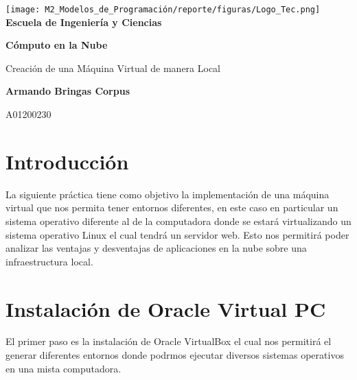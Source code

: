 \documentclass[12pt,a4paper]{article}
\begin{document}
\begin{titlepage}
    \centering
    \texttt{[image: M2\_Modelos\_de\_Programación/reporte/figuras/Logo\_Tec.png]}\\
    \vspace{.5cm}
    \bfseries\large Escuela de Ingeniería y Ciencias
        
    \vspace{5cm}
    \centering
    \textbf{\Huge Cómputo en la Nube}
    \vspace{0.5cm}
        
    {\Large Creación de una Máquina Virtual de manera Local}

    \vspace{5cm}
        
    \textbf{\LARGE Armando Bringas Corpus}
        
    \vspace{0.5cm}
        
    {\large A01200230}
        
    \vfill
        
\end{titlepage}

\section{Introducción}

La siguiente práctica tiene como objetivo la implementación de una máquina virtual que nos permita tener entornos diferentes, en este caso en particular un sistema operativo diferente al de la computadora donde se estará virtualizando un sistema operativo Linux el cual tendrá un servidor web. Esto nos permitirá poder analizar las ventajas y desventajas de aplicaciones en la nube sobre una infraestructura local.

\section{Instalación de Oracle Virtual PC}

El primer paso es la instalación de Oracle VirtualBox el cual nos permitirá el generar diferentes entornos donde podrmos ejecutar diversos sistemas operativos en una mista computadora.
\end{document}
